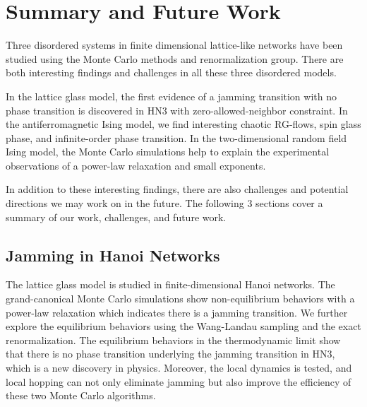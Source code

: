

\chapter{Summary and Future Work}
\label{chap-summary}

Three disordered systems in finite dimensional lattice-like networks have been studied using the Monte Carlo methods and renormalization group. There are both interesting findings and challenges in all these three disordered models. 

In the lattice glass model, the first evidence of a jamming transition with no phase transition is discovered in HN3 with zero-allowed-neighbor constraint. In the antiferromagnetic Ising model, we find interesting chaotic RG-flows, spin glass phase, and infinite-order phase transition. In the two-dimensional random field Ising model, the Monte Carlo simulations help to explain the experimental observations of a power-law relaxation and small exponents. 

In addition to these interesting findings, there are also challenges and potential directions we may work on in the future. The following 3 sections cover a summary of our work, challenges, and future work.

\section{Jamming in Hanoi Networks}
The lattice glass model is studied in finite-dimensional Hanoi networks. The grand-canonical Monte Carlo simulations show non-equilibrium behaviors with a power-law relaxation which indicates there is a jamming transition. We further explore the equilibrium behaviors using the Wang-Landau sampling and the exact renormalization. The equilibrium behaviors in the thermodynamic limit show that there is no phase transition underlying the jamming transition in HN3, which is a new discovery in physics. Moreover, the local dynamics is tested, and local hopping can not only eliminate jamming but also improve the efficiency of these two Monte Carlo algorithms.  

